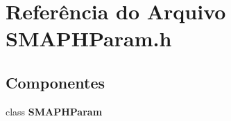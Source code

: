 \section{Referência do Arquivo S\+M\+A\+P\+H\+Param.\+h}
\label{_s_m_a_p_h_param_8h}
\subsection*{Componentes}
\begin{DoxyCompactItemize}
\item 
class {\bf S\+M\+A\+P\+H\+Param}
\end{DoxyCompactItemize}
